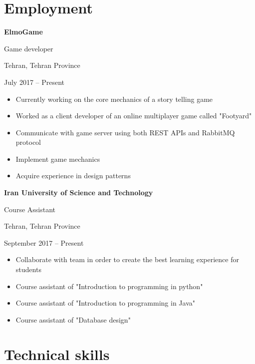 \documentclass{article}
\begin{document}
\section {Employment}
\noindent \textbf{ElmoGame} \par
Game developer \par
Tehran, Tehran Province \par
July 2017 – Present \par
\begin{itemize}
        \item Currently working on the core mechanics of a story telling game
        \item Worked as a client developer of an online multiplayer game called "Footyard"
        \item Communicate with game server using both REST APIs and RabbitMQ protocol
        \item Implement game mechanics 
        \item Acquire experience in design patterns
\end{itemize}

\pagebreak

\noindent \textbf{Iran University of Science and Technology} \par
Course Assistant \par
Tehran, Tehran Province \par
September 2017 – Present \par
\begin{itemize}
        \item Collaborate with team in order to create the best learning experience for students
        \item Course assistant of "Introduction to programming in python"
        \item Course assistant of "Introduction to programming in Java"
        \item Course assistant of "Database design"
\end{itemize}

\section{Technical skills}
\end{document}
